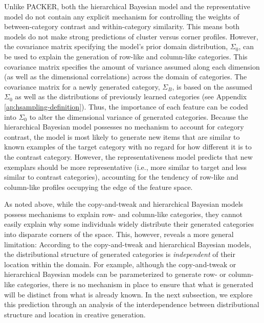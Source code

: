 \documentclass[12pt]{article}
\begin{document}
\begin{flushleft}
Unlike PACKER, both the hierarchical Bayesian model and the representative model
do not contain any explicit mechanism for controlling the weights of
between-category contrast and within-category similarity. This means both models
do not make strong predictions of cluster versus corner profiles. However, the
covariance matrix specifying the model's prior domain distribution, $\Sigma_0$,
can be used to explain the generation of row-like and column-like categories.
This covariance matrix specifies the amount of variance assumed along each
dimension (as well as the dimensional correlations) across the domain of
categories. The covariance matrix for a newly generated category, $\Sigma_B$, is
based on the assumed $\Sigma_0$ as well as the distributions of previously
learned categories (see Appendix \ref{ap:hsampling-definition}). Thus, the
importance of each feature can be coded into $\Sigma_0$ to alter the dimensional
variance of generated categories. Because the hierarchical Bayesian model
possesses no mechanism to account for category contrast, the model is most
likely to generate new items that are similar to known examples of the target
category with no regard for how different it is to the contrast category.
However, the representativeness model predicts that new exemplars should be more
representative (i.e., more similar to target and less similar to contrast
categories), accounting for the tendency of row-like and column-like profiles
occupying the edge of the feature space.

As noted above, while the copy-and-tweak and hierarchical Bayesian models
possess mechanisms to explain row- and column-like categories, they cannot
easily explain why some individuals widely distribute their generated categories
into disparate corners of the space. This, however, reveals a more general
limitation: According to the copy-and-tweak and hierarchical Bayesian models,
the distributional structure of generated categories is {\em independent} of
their location within the domain. For example, although the copy-and-tweak or
hierarchical Bayesian models can be parameterized to generate row- or
column-like categories, there is no mechanism in place to ensure that what is
generated will be distinct from what is already known. In the next subsection,
we explore this prediction through an analysis of the interdependence between
distributional structure and location in creative generation.


\end{flushleft}
\end{document}
